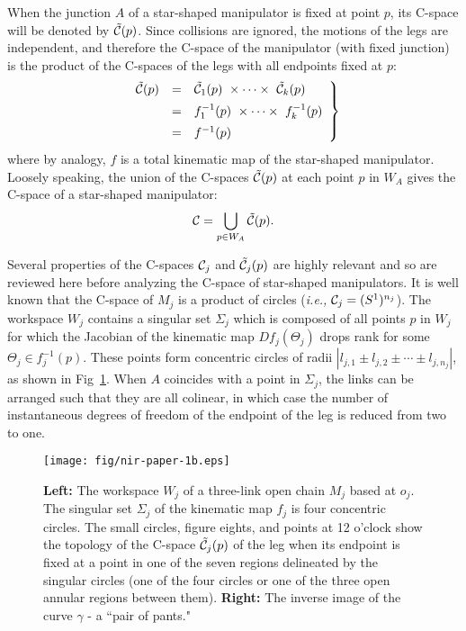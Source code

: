 \documentclass[twocolumn]{IEEEtran}
\begin{document}
When the junction $A$ of a star-shaped manipulator is fixed at point
$p$, its C-space will be denoted by $\tilde {\cal C}(p)$. Since
collisions are ignored, the motions of the legs are independent, and
therefore the C-space of the manipulator (with fixed junction) is
the product of the C-spaces of the legs with all endpoints fixed at
$p$:
\begin{equation}
\label{eq:def_tildeCp}
   \left. \begin{array}{rcl}
   \tilde {\cal C}(p) & = & \tilde {\cal C}_1(p) \ \times
           \cdots \times \ \tilde {\cal C}_k(p) \\ [5pt]
          & = & f_1^{-1}(p) \ \times \cdots \times \ f_k^{-1}(p) \\ [5pt]
          & = & f^{-1}(p)
   \end{array} \right\}
\end{equation}
where by analogy, $f$ is a total kinematic map of the star-shaped
manipulator. Loosely speaking, the union of the C-spaces $\tilde
{\cal C}(p)$ at each point $p$ in $W_A$ gives the C-space of a
star-shaped manipulator:
\begin{equation}
\label{eq:def_C}
   {\cal C} = \bigcup_{p \in W_A} \tilde {\cal C}(p).
\end{equation}

Several properties of the C-spaces ${\cal C}_j$ and $\tilde {\cal
C}_j(p)$ are highly relevant and so are reviewed here before
analyzing the C-space of star-shaped manipulators.  It is well known
that the C-space of $M_j$ is a product of circles ({\em i.e.,}
${\cal C}_j = (S^1)^{n_j}$).  The workspace $W_j$ contains a
singular set $\Sigma_j$ which is composed of all points $p$ in $W_j$
for which the Jacobian of the kinematic map $Df_j(\Theta_j)$ drops
rank for some $\Theta_j \in f_j^{-1}(p)$. These points form
concentric circles of radii $|l_{j,1}\pm l_{j,2} \pm \cdots \pm
l_{j,n_j}|$, as shown in Fig~\ref{fig:single-leg}. When $A$ coincides
with a point in $\Sigma_j$, the links can be arranged such that they
are all colinear, in which case the number of instantaneous degrees
of freedom of the endpoint of the leg is reduced from two to one.
\begin{figure}
  \centering
  \texttt{[image: fig/nir-paper-1b.eps]}
  \caption{{\bf Left:} The workspace $W_j$ of a three-link open chain $M_j$
    based at $o_j$. The singular set $\Sigma_j$ of the kinematic map $f_j$ is four
    concentric circles.  The small circles, figure eights, and points at 12 o'clock
    show the topology of the C-space $\tilde {\cal C}_j(p)$ of the
    leg when its endpoint is fixed at a point in one of the seven regions
    delineated by the singular circles (one of the four circles or one of
    the three open annular regions between them).  {\bf Right:} The inverse
    image of the curve $\gamma$ - a ``pair of pants."}
 \label{fig:single-leg}
\end{figure}
\end{document}
